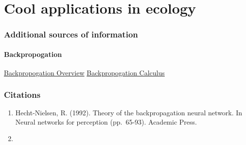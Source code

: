 \documentclass[
]{article}
\providecommand{\tightlist}{%
  \setlength{\itemsep}{0pt}\setlength{\parskip}{0pt}}
\begin{document}
\hypertarget{cool-applications-in-ecology}{%
\section{Cool applications in
ecology}\label{cool-applications-in-ecology}}

\hypertarget{additional-sources-of-information}{%
\subsubsection{Additional sources of
information}\label{additional-sources-of-information}}

\hypertarget{backpropogation}{%
\paragraph{Backpropogation}\label{backpropogation}}

\href{https://www.youtube.com/watch?v=Ilg3gGewQ5U}{Backpropogation
Overview}
\href{https://www.youtube.com/watch?v=tIeHLnjs5U8}{Backpropogation
Calculus}

\hypertarget{citations}{%
\subsubsection{Citations}\label{citations}}

\begin{enumerate}
\def\labelenumi{\arabic{enumi}.}
\tightlist
\item
  Hecht-Nielsen, R. (1992). Theory of the backpropagation neural
  network. In Neural networks for perception (pp.~65-93). Academic
  Press.
\item
\end{enumerate}
\end{document}
